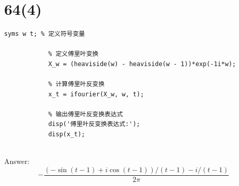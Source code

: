 \documentclass{article}
\begin{document}
    \section*{64(4)}
        \begin{lstlisting}[caption={题64(4)MATLAB代码}, label={lst:matlab}]
            syms w t; % 定义符号变量

            % 定义傅里叶变换
            X_w = (heaviside(w) - heaviside(w - 1))*exp(-1i*w);
            
            % 计算傅里叶反变换
            x_t = ifourier(X_w, w, t);
            
            % 输出傅里叶反变换表达式
            disp('傅里叶反变换表达式:');
            disp(x_t);
            
        \end{lstlisting}
        Answer: \[ - \frac{{\left( { - \sin \left( {t - 1} \right) + i\cos \left( {t - 1} \right)} \right)/\left( {t - 1} \right) - i/\left( {t - 1} \right)}}{{2\pi }}\]
\end{document}
